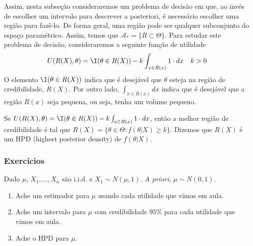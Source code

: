 Assim, nesta subseção consideraremos 
um problema de decisão em que,
ao invés de escolher um intervalo para 
descrever a posteriori,
é necessário escolher uma região para fazê-lo.
De forma geral, uma região pode ser 
qualquer subconjunto do espaço paramétrico.
Assim, temos que
$\mathcal{A}_{*} = \{R \subset \Theta\}$.
Para estudar este problema de decisão,
consideraremos a seguinte função de utilidade
\begin{align*}
 U(R(X),\theta)	
 &= \I(\theta \in R(X)) 
 -k\int_{x \in R(x)}{1 \cdot dx}
 & k > 0
\end{align*}
O elemento $\I(\theta \in R(X))$ indica que 
é desejável que $\theta$ esteja 
na região de credibilidade, $R(X)$.
Por outro lado,  $\int_{x \in R(x)}{dx}$ indica que
é desejável que a região $R(x)$ seja pequena, 
ou seja, tenha um volume pequeno.
\begin{theorem}
 \label{thm:hpd}
 Se $U(R(X),\theta)	= \I(\theta \in R(X)) - k\int_{x \in R(x)}{1 \cdot dx}$, então 
 a melhor região de credibilidade é tal que 
 $R(X) = \{\theta \in \Theta: f(\theta|X) \geq k\}$.
 Dizemos que $R(X)$ é um HPD (highest posterior density) 
 de $f(\theta|X)$.
\end{theorem}

\subsubsection*{Exercícios}

\begin{exercise}
 \label{ex:normal-credible}
 Dado $\mu$, $X_{1},\ldots,X_{n}$ são i.i.d. e 
 $X_{1} \sim N(\mu,1)$.
 \emph{A priori}, $\mu \sim N(0,1)$.
 \begin{enumerate}[label=(\alph*)]
  \item Ache um estimador para $\mu$ usando 
  cada utilidade que vimos em aula.
  \item Ache um intervalo para $\mu$ com 
  credibilidade $95\%$ para 
  cada utilidade que vimos em aula.
  \item Ache o HPD para $\mu$.
 \end{enumerate}
\end{exercise}

